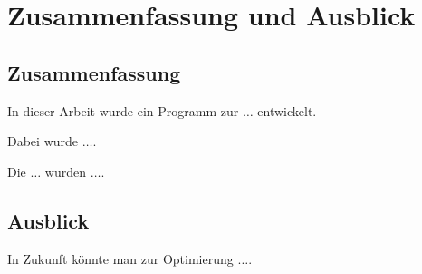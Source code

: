 \section{Zusammenfassung und Ausblick}
\label{sec:zusammenfassung_und_ausblick}

\subsection{Zusammenfassung}
\label{ssec:zusammenfassung}

In dieser Arbeit wurde ein Programm zur $\ldots$ entwickelt.

Dabei wurde $\ldots$.

Die $\ldots$ wurden $\ldots$.

\subsection{Ausblick}
\label{ssec:ausblick}

In Zukunft könnte man zur Optimierung $\ldots$.